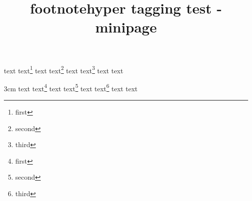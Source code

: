 \documentclass{article}
\title{footnotehyper tagging test - minipage}
\begin{document}
\begin{savenotes}
\begin{minipage}{3cm}
text text\footnote{first} text text\footnote{second} text text\footnote{third} text text
\end{minipage}
\end{savenotes}

\begin{minipage*}{3cm}
text text\footnote{first} text text\footnote{second} text text\footnote{third} text text
\end{minipage*}
\end{document}
